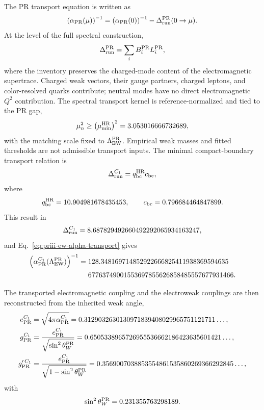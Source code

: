 \documentclass[11pt]{article}
\begin{document}
The PR transport equation is written as
\begin{equation}
\left(\alpha_{\rm PR}(\mu)\right)^{-1}
=
\left(\alpha_{\rm PR}(0)\right)^{-1}
-
\Delta_{\rm run}^{\rm PR}(0\rightarrow\mu).
\label{eq:priii-ew-alpha-transport}
\end{equation}
At the level of the full spectral construction,
\begin{equation}
\Delta_{\rm run}^{\rm PR}
=
\sum_i B_i^{\rm PR}L_i^{\rm PR},
\end{equation}
where the inventory preserves the charged-mode content of the electromagnetic supertrace.  Charged weak vectors, their gauge partners, charged leptons, and color-resolved quarks contribute; neutral modes have no direct electromagnetic \(Q^2\) contribution.  The spectral transport kernel is reference-normalized and tied to the PR gap,
\begin{equation}
\mu_n^2\geq
\left(\mu_{\min}^{\rm HR}\right)^2
=
3.053016666732689,
\end{equation}
with the matching scale fixed to \(\Lambda_{\rm EW}^{\rm PR}\).  Empirical weak masses and fitted thresholds are not admissible transport inputs. The minimal compact-boundary transport relation is
\begin{equation}
\Delta_{\rm run}^{C_1}
=
q_{\rm bc}^{\rm HR}c_{\rm bc},
\label{eq:priii-ew-C1-running}
\end{equation}
where
\begin{equation}
q_{\rm bc}^{\rm HR}=10.904981678435453,
\qquad
c_{\rm bc}=0.796684464847899.
\end{equation}
This result in 
\begin{equation}
\Delta_{\rm run}^{C_1}
=
8.687829492660492292065934163247,
\end{equation}
and Eq.~\eqref{eq:priii-ew-alpha-transport} gives
\begin{equation}
\begin{split}
\left(\alpha_{\rm PR}^{C_1}(\Lambda_{\rm EW}^{\rm PR})\right)^{-1}
= {} &
128.348169714852922666825411938369594635\\
&67763749001553697855626858485557677931466 .
\label{eq:priii-ew-alpha-C1}
\end{split}
\end{equation}

The transported electromagnetic coupling and the electroweak couplings are then reconstructed from the inherited weak angle,
\begin{align}
e_{\rm PR}^{C_1}
&=
\sqrt{4\pi\alpha_{\rm PR}^{C_1}}
=
0.3129032630130971839408029965751121711\ldots,
\\
g_{\rm PR}^{C_1}
&=
\frac{e_{\rm PR}^{C_1}}
{\sqrt{\sin^2\theta_W^{\rm PR}}}
=
0.6505338965726955536662186423635601421\ldots,
\\
g_{\rm PR}^{\prime\,C_1}
&=
\frac{e_{\rm PR}^{C_1}}
{\sqrt{1-\sin^2\theta_W^{\rm PR}}}
=
0.3569007038853554861535860269366292845\ldots,
\end{align}
with
\begin{equation}
\sin^2\theta_W^{\rm PR}=0.231355763298189.
\end{equation}
\end{document}
